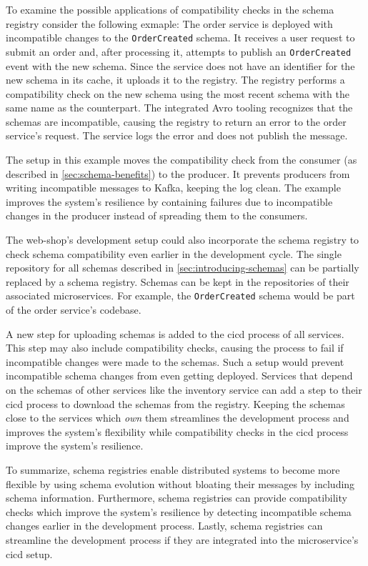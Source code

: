 To examine the possible applications of compatibility checks in the schema registry consider the following exmaple:
The order service is deployed with incompatible changes to the \texttt{OrderCreated} schema.
It receives a user request to submit an order and, after processing it, attempts to publish an \texttt{OrderCreated} event with the new schema.
Since the service does not have an identifier for the new schema in its cache, it uploads it to the registry.
The registry performs a compatibility check on the new schema using the most recent schema with the same name as the counterpart.
The integrated Avro tooling recognizes that the schemas are incompatible, causing the registry to return an error to the order service's request.
The service logs the error and does not publish the message.

The setup in this example moves the compatibility check from the consumer (as described in \ref{sec:schema-benefits}) to the producer.
It prevents producers from writing incompatible messages to Kafka, keeping the log clean.
The example improves the system's resilience by containing failures due to incompatible changes in the producer instead of spreading them to the consumers.

The web-shop's development setup could also incorporate the schema registry to check schema compatibility even earlier in the development cycle.
The single repository for all schemas described in \ref{sec:introducing-schemas} can be partially replaced by a schema registry.
Schemas can be kept in the repositories of their associated microservices.
For example, the \texttt{OrderCreated} schema would be part of the order service's codebase.

A new step for uploading schemas is added to the \gls{cicd} process of all services.
This step may also include compatibility checks, causing the process to fail if incompatible changes were made to the schemas.
Such a setup would prevent incompatible schema changes from even getting deployed.
Services that depend on the schemas of other services like the inventory service can add a step to their \gls{cicd} process to download the schemas from the registry.
Keeping the schemas close to the services which \emph{own} them streamlines the development process and improves the system's flexibility while compatibility checks in the \gls{cicd} process improve the system's resilience.

To summarize, schema registries enable distributed systems to become more flexible by using schema evolution without bloating their messages by including schema information.
Furthermore, schema registries can provide compatibility checks which improve the system's resilience by detecting incompatible schema changes earlier in the development process.
Lastly, schema registries can streamline the development process if they are integrated into the microservice's \gls{cicd} setup.
